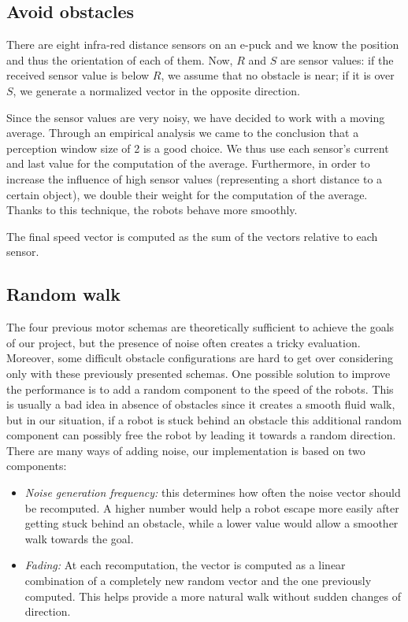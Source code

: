 \documentclass[journal]{IEEEtran}
\begin{document}
\subsection{Avoid obstacles}
There are eight infra-red distance sensors on an e-puck and we know the position and thus the orientation of each of them. Now, $R$ and $S$ are sensor values: if the received sensor value is below $R$, we assume that no obstacle is near; if it is over $S$, we generate a normalized vector in the opposite
direction. 

Since the sensor values are very noisy, we have decided to work with a moving average. Through 
an empirical analysis we came to the conclusion that a perception window size of 2 is a good 
choice. We thus use each sensor's current and last value for the computation of the average. 
Furthermore, in order to increase the influence of high sensor values (representing a short 
distance to a certain object), we double their weight for the computation of the average. 
Thanks to this technique, the robots behave more smoothly.

The final speed vector is computed as the sum of the vectors relative to each sensor.

\subsection{Random walk}
The four previous motor schemas are theoretically sufficient to achieve
the goals of our project, but the presence of noise often creates a tricky evaluation. Moreover, some difficult obstacle configurations are hard to get over considering only with these previously presented schemas. One possible solution to improve the performance is to add a random component to the speed of the robots. This is usually a bad idea in absence of obstacles since it creates a smooth fluid walk, but in our situation, if a robot is stuck behind an obstacle this additional random component can possibly free the robot by leading it towards a random direction.
There are many ways of adding noise, our implementation is based on two
components:
\begin{itemize}
\item \textit{Noise generation frequency:} this determines how often the noise vector should be recomputed. A higher number would help a robot escape more easily after getting stuck behind an obstacle, while a lower value would allow a smoother walk towards the goal.
\item \textit{Fading:} At each recomputation, the vector is computed as a linear combination of a completely new random vector and the one previously computed. This helps provide a more natural walk without sudden changes of direction.
\end{itemize}
\end{document}
